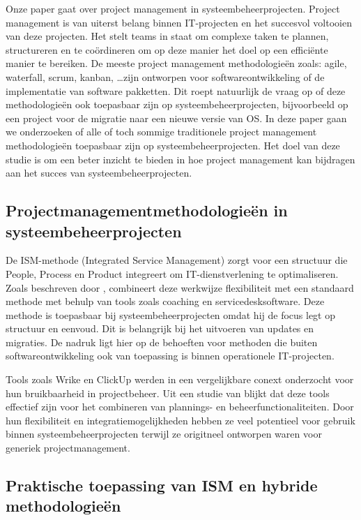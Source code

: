 \documentclass{article}
\begin{document}
    Onze paper gaat over project management in systeembeheerprojecten. 
    Project management is van uiterst belang binnen IT-projecten en het succesvol voltooien van deze projecten. 
    Het stelt teams in staat om complexe taken te plannen, structureren en te coördineren om op deze manier het doel op een efficiënte manier te bereiken.
    De meeste project management methodologieën zoals: agile, waterfall, scrum, kanban, \ldots zijn ontworpen voor softwareontwikkeling of de implementatie van software pakketten.
    Dit roept natuurlijk de vraag op of deze methodologieën ook toepasbaar zijn op systeembeheerprojecten, bijvoorbeeld op een project voor de migratie naar een nieuwe versie van OS.
    In deze paper gaan we onderzoeken of alle of toch sommige traditionele project management methodologieën toepasbaar zijn op systeembeheerprojecten.
    Het doel van deze studie is om een beter inzicht te bieden in hoe project management kan bijdragen aan het succes van systeembeheerprojecten. 

    \subsection{Projectmanagementmethodologieën in systeembeheerprojecten}

    De ISM-methode (Integrated Service Management) zorgt voor een structuur die People, Process en Product integreert om IT-dienstverlening te optimaliseren. 
    Zoals beschreven door \textcite{hoving2010ism}, combineert deze werkwijze flexibiliteit met een standaard methode met behulp van tools zoals coaching en servicedesksoftware.
    Deze methode is toepasbaar bij systeembeheerprojecten omdat hij de focus legt op structuur en eenvoud. Dit is belangrijk bij het uitvoeren van updates en migraties.
    De nadruk ligt hier op de behoeften voor methoden die buiten softwareontwikkeling ook van toepassing is binnen operationele IT-projecten. \autocite{hoving2010ism}

    Tools zoals Wrike en ClickUp werden in een vergelijkbare conext onderzocht voor hun bruikbaarheid in projectbeheer.
    Uit een studie van \textcite{pasaric2022comparison} blijkt dat deze tools effectief zijn voor het combineren van plannings- en beheerfunctionaliteiten.
    Door hun flexibiliteit en integratiemogelijkheden hebben ze veel potentieel voor gebruik binnen systeembeheerprojecten terwijl ze origitneel ontworpen waren voor generiek projectmanagement. \autocite{pasaric2022comparison}

    \newpage
    \subsection{Praktische toepassing van ISM en hybride methodologieën}
\end{document}
